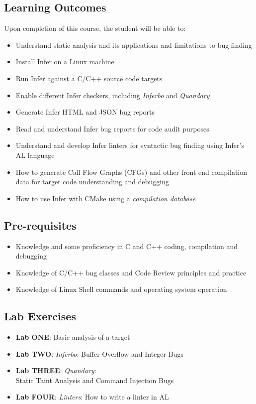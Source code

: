 \subsection{Learning Outcomes}

Upon completion of this course, the student will be able to:
\begin{itemize}
	\itemsep0em
\item Understand static analysis and its applications and limitations to bug finding
\item Install Infer on a Linux machine
\item Run Infer against a C/C++ source code targets
\item Enable different Infer checkers, including \textit{Inferbo} and \textit{Quandary}
\item Generate Infer HTML and JSON bug reports
\item Read and understand Infer bug reports for code audit purposes
\item Understand and develop Infer linters for syntactic bug finding using Infer's AL language 
\item How to generate Call Flow Graphs (CFGs) and other front end compilation data for target code understanding and debugging
\item How to use Infer with CMake using a \textit{compilation database}
\end{itemize}

\subsection{Pre-requisites}
\begin{itemize}
\item Knowledge and some proficiency in C and C++ coding, compilation and debugging
\item Knowledge of C/C++ bug classes and Code Review principles and practice 
\item Knowledge of Linux Shell commands and operating system operation
\end{itemize}

\subsection{Lab Exercises}

\begin{itemize}
\item \textbf{Lab ONE}: Basic analysis of a target
\item \textbf{Lab TWO}: \textit{Inferbo}: Buffer Overflow and Integer Bugs
\item \textbf{Lab THREE}: \textit{Quandary}: \\Static Taint Analysis and Command Injection Bugs
\item \textbf{Lab FOUR}: \textit{Linters}: How to write a linter in AL
\end{itemize}